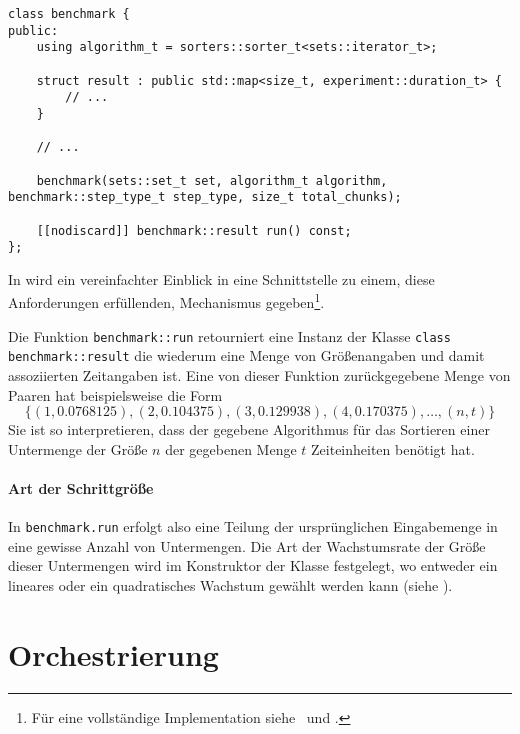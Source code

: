 \begin{lstlisting}[caption={Klasse zur Approximation einer Funktion der Laufzeit eines Algorithmus in Abhängigkeit der Eingabegröße.}, label=lst:simple-benchmark]
class benchmark {
public:
	using algorithm_t = sorters::sorter_t<sets::iterator_t>;

	struct result : public std::map<size_t, experiment::duration_t> {
	    // ...
	}

	// ...

	benchmark(sets::set_t set, algorithm_t algorithm, benchmark::step_type_t step_type, size_t total_chunks);

	[[nodiscard]] benchmark::result run() const;
};
\end{lstlisting}
\noindent
In  wird ein vereinfachter Einblick in eine Schnittstelle zu einem, diese Anforderungen erfüllenden, Mechanismus gegeben\footnote{Für eine vollständige Implementation siehe \crBenchmark~und \crBenchmarkImpl.}.

Die Funktion \lstinline{benchmark::run} retourniert eine Instanz der Klasse \lstinline{class benchmark::result} die wiederum eine Menge von Größenangaben und damit assoziierten Zeitangaben ist. Eine von dieser Funktion zurückgegebene Menge von Paaren hat beispielsweise die Form
\begin{equation*}
	\{
		(1, 0.0768125),
		(2, 0.104375),
		(3, 0.129938),
		(4, 0.170375),
		\ldots,
		(n, t)
	\}
\end{equation*}
Sie ist so interpretieren, dass der gegebene Algorithmus für das Sortieren einer Untermenge der Größe $n$ der gegebenen Menge $t$ Zeiteinheiten benötigt hat.

\paragraph{Art der Schrittgröße}

In \lstinline{benchmark.run} erfolgt also eine Teilung der ursprünglichen Eingabemenge in eine gewisse Anzahl von Untermengen. Die Art der Wachstumsrate der Größe dieser Untermengen wird im Konstruktor der Klasse festgelegt, wo entweder ein lineares oder ein quadratisches Wachstum gewählt werden kann (siehe ).



\section{Orchestrierung}
\label{sec:runtime-orchestration}

